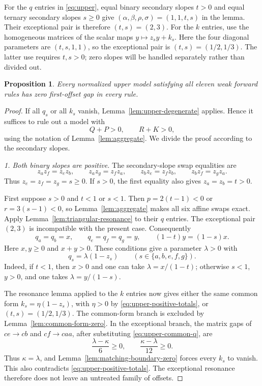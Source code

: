 \documentclass[11pt,a4paper]{article}
\newtheorem{proposition}[theorem]{Proposition}
\begin{document}
For the $q$ entries in \eqref{eq:upper}, equal binary secondary slopes
$t>0$ and equal ternary secondary slopes $s\ge0$ give
$(\alpha,\beta,\rho,\sigma)=(1,1,t,s)$ in the lemma. Their exceptional
pair is therefore $(t,s)=(2,3)$. For the $k$ entries, use the homogeneous
matrices of the scalar maps $y\mapsto z_sy+k_s$. Here the four diagonal
parameters are $(t,s,1,1)$, so the exceptional pair is
$(t,s)=(1/2,1/3)$. The latter use requires $t,s>0$; zero slopes will be
handled separately rather than divided out.

\begin{proposition}\label{prop:upper}
Every normalized upper model satisfying all eleven weak forward rules
has zero first-offset gap in every rule.
\end{proposition}

\begin{proof}
If all $q_s$ or all $k_s$ vanish, Lemma~\ref{lem:upper-degenerate}
applies. Hence it suffices to rule out a model with
\begin{equation}\label{eq:upper-positive-totals}
Q+P>0,\qquad R+K>0,
\end{equation}
using the notation of Lemma~\ref{lem:aggregate}. We divide the proof
according to the secondary slopes.

\smallskip\noindent
\emph{1. Both binary slopes are positive.}
The secondary-slope swap equalities are
\begin{equation}\label{eq:upper-slope-equalities}
z_a z_f=z_e z_b,\qquad z_a z_g=z_f z_a,\qquad
z_b z_e=z_f z_b,\qquad z_b z_f=z_g z_a.
\end{equation}
Thus $z_e=z_f=z_g=s\ge0$. If $s>0$, the first equality also gives
$z_a=z_b=t>0$.

First suppose $s>0$ and $t<1$ or $s<1$. Then
$p=2(t-1)<0$ or $r=3(s-1)<0$, so Lemma~\ref{lem:aggregate} makes
all six affine swaps exact. Apply Lemma~\ref{lem:triangular-resonance}
to their $q$ entries. The exceptional pair $(2,3)$ is incompatible with
the present case. Consequently
\[
q_a=q_b=x,\qquad q_e=q_f=q_g=y,\qquad
(1-t)y=(1-s)x.
\]
Here $x,y\ge0$ and $x+y>0$. These conditions give a parameter
$\lambda>0$ with
\begin{equation}\label{eq:upper-common-q}
q_s=\lambda(1-z_s)\qquad(s\in\{a,b,e,f,g\}).
\end{equation}
Indeed, if $t<1$, then $x>0$ and one can take
$\lambda=x/(1-t)$; otherwise $s<1$, $y>0$, and one takes
$\lambda=y/(1-s)$.

The resonance lemma applied to the $k$ entries now gives either the
same common form $k_s=\eta(1-z_s)$, with $\eta>0$ by
\eqref{eq:upper-positive-totals}, or $(t,s)=(1/2,1/3)$.
The common-form branch is excluded by Lemma~\ref{lem:common-form-zero}.
In the exceptional branch, the matrix gaps of $ce\to cb$ and
$cf\to caa$, after substituting \eqref{eq:upper-common-q}, are
\[
\frac{\lambda-\kappa}{6}\ge0,
\qquad
\frac{\kappa-\lambda}{12}\ge0.
\]
Thus $\kappa=\lambda$, and Lemma~\ref{lem:matching-boundary-zero}
forces every $k_s$ to vanish. This also contradicts
\eqref{eq:upper-positive-totals}. The exceptional resonance therefore
does not leave an untreated family of offsets.


\end{proof}
\end{document}
